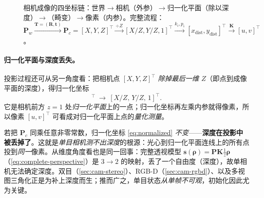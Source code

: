 \begin{figure}[ht]
\centering
{}
\caption{相机成像的四坐标链：世界$\to$相机（外参）$\to$归一化平面（除以深度）$\to$（畸变）$\to$像素（内参）。完整流程：$\mathbf{P}_w\xrightarrow{\mathbf{T}=(\mathbf{R},\mathbf{t})}\mathbf{P}_c=[X,Y,Z]^\top\xrightarrow{\div Z}[X/Z,Y/Z,1]^\top\xrightarrow{k_i,p_i}[x_{\text{dist}},y_{\text{dist}}]^\top\xrightarrow{\mathbf{K}}[u,v]^\top$。}
\label{fig:coord-chain}
\end{figure}

\paragraph{归一化平面与深度丢失。}
投影过程还可从另一角度看\cite{gaoxiang2019slam14}：把相机点 $[X,Y,Z]^\top$ \emph{除掉最后一维 $Z$}（即点到成像平面的深度），得归一化坐标
\begin{equation}
  [X,Y,Z]^\top\ \longrightarrow\ [X/Z,\,Y/Z,\,1]^\top.
  \label{eq:normalized}
\end{equation}
它是相机前方 $z=1$ 处\emph{归一化平面}上的一点；归一化坐标再左乘内参就得像素，所以像素 $[u,v]^\top$ 可看成对归一化平面上点的\emph{量化测量}。

\begin{insight}[深度在投影中丢失 = 单目测不出深度]
若把 $\mathbf{P}_c$ 同乘任意非零常数，归一化坐标 \cref{eq:normalized} \emph{不变}——\textbf{深度在投影中被丢掉了}。这就是\emph{单目相机测不出深度}的根源：光心到归一化平面连线上的所有点投到\emph{同一}像素\cite{gaoxiang2019slam14}。从维度角度看也是同一回事：完整透视模型 $\mathbf{s}(\boldsymbol\rho)=\mathbf{P}\mathbf{K}\tfrac1z\boldsymbol\rho$（\cref{eq:complete-perspective}）是 $3\to2$ 的映射，丢了一个自由度（深度），故单相机无法确定深度\cite{barfoot2024state}。双目（\cref{sec:cam-stereo}）、RGB-D（\cref{sec:cam-rgbd}）、以及多视图三角化正是为补上深度而生；推而广之，单目状态\emph{从单帧不可观}，初始化因此尤为关键\cite{carlone2026handbook}。
\end{insight}

